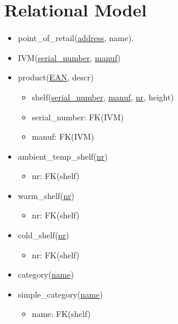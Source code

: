 \documentclass[12pt,a4paper]{report}
\begin{document}


\section*{Relational Model}

\begin{itemize}
  
\item point\_of\_retail(\underline{address}, name).

\item IVM(\underline{serial\_number}, \underline{manuf})
  
\item product(\underline{EAN}, descr)
  \begin{itemize}
  \item shelf(\underline{serial\_number}, \underline{manuf}, \underline{nr}, height)
  \item serial\_number: FK(IVM)
  \item manuf: FK(IVM)
  \end{itemize}

\item ambient\_temp\_shelf(\underline{nr})
  \begin{itemize}
  \item nr: FK(shelf)
  \end{itemize}

\item warm\_shelf(\underline{nr})
  \begin{itemize}
  \item nr: FK(shelf)
  \end{itemize}
  
\item cold\_shelf(\underline{nr})
  \begin{itemize}
  \item nr: FK(shelf)
  \end{itemize}

\item category(\underline{name})
  
\item simple\_category(\underline{name})
  \begin{itemize}
  \item name: FK(shelf)
  \end{itemize}


\end{itemize}
\end{document}

